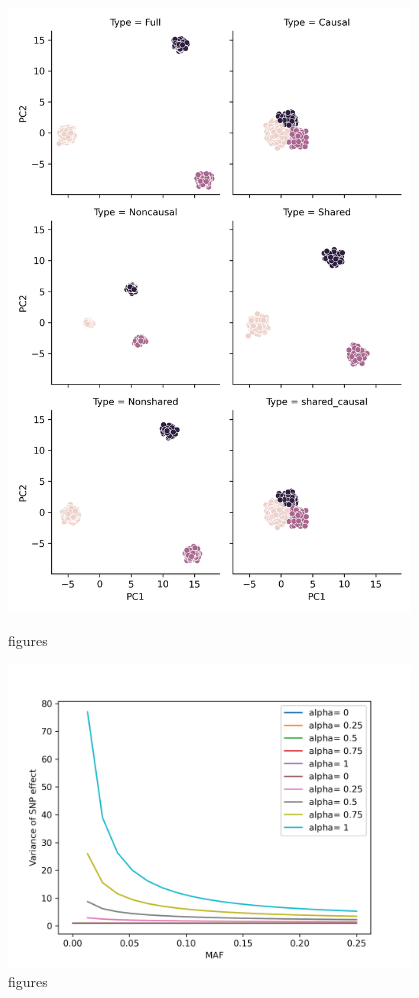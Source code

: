 \documentclass[sn-nature]{sn-jnl}%
\begin{document}
\begin{figure}
  \begin{center}
    \includegraphics[width= 0.95\textwidth]{figures/genetic_clusters.png} \\
  \end{center}
  \caption{figures}
  \label{fig:all_figures}
\end{figure}
\begin{figure}
  \begin{center}
    \includegraphics[width= 0.95\textwidth]{figures/SNPalphaControl.png}
  \end{center}
  \caption{figures}
  \label{fig:all_figures}
\end{figure}
\end{document}
